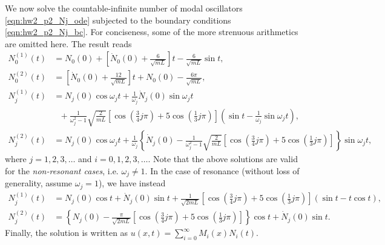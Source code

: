 We now solve the countable-infinite number of modal oscillators \cref{eqn:hw2_p2_Nj_ode} subjected to the boundary conditions \cref{eqn:hw2_p2_Nj_bc}. 
For conciseness, some of the more strenuous arithmetics are omitted here. 
The result reads 
\begin{equation}
\begin{aligned}
    N_0^{(1)}(t) &= N_0(0) + \left[\dot{N}_0(0) + \frac{6}{\sqrt{mL}}\right]t - \frac{6}{\sqrt{mL}}\sin t, \\
    N_0^{(2)}(t) &= \left[\dot{N}_0(0) + \frac{12}{\sqrt{mL}}\right] t + N_0(0) - \frac{6\pi}{\sqrt{mL}}, \\
    N_j^{(1)}(t) &= N_j(0) \cos\omega_j t + \frac{1}{\omega_j}\dot{N}_j(0)\sin\omega_j t \\
    &~~~+ \frac{1}{\omega_j^2 - 1}\sqrt{\frac{2}{mL}} \left[ \cos\left( \frac{3}{4}j\pi \right) + 5\cos\left( \frac{1}{3}j\pi \right) \right] \left(\sin t - \frac{1}{\omega_j}\sin\omega_j t\right), \\
    N_j^{(2)}(t) &= N_j(0) \cos\omega_j t + \frac{1}{\omega_j} \left\{ \dot{N}_j(0) - \frac{1}{\omega_j^2 - 1}\sqrt{\frac{2}{mL}} \left[ \cos\left( \frac{3}{4}j\pi \right) + 5\cos\left( \frac{1}{3}j\pi \right) \right] \right\} \sin\omega_j t, 
\end{aligned}
\end{equation}
where $j = 1, 2, 3, \ldots$ and $i = 0, 1, 2, 3, \ldots$. 
Note that the above solutions are valid for the \emph{non-resonant cases}, i.e. $\omega_j \neq 1$. 
In the case of resonance (without loss of generality, assume $\omega_j = 1$), we have instead 
\begin{equation}
\begin{aligned}
    N_j^{(1)}(t) &= N_j(0) \cos t + \dot{N}_j(0) \sin t + \frac{1}{\sqrt{2mL}} \left[ \cos\left( \frac{3}{4}j\pi \right) + 5\cos\left( \frac{1}{3}j\pi \right) \right] (\sin t - t \cos t), \\
    N_j^{(2)}(t) &= \left\{ N_j(0) - \frac{\pi}{\sqrt{2mL}} \left[ \cos\left( \frac{3}{4}j\pi \right) + 5\cos\left( \frac{1}{3}j\pi \right) \right] \right\}  \cos t + \dot{N}_j(0) \sin t.
\end{aligned}
\end{equation}
Finally, the solution is written as $\boxed{u(x, t) = \sum_{i=0}^\infty M_i(x) N_i(t)}$.


